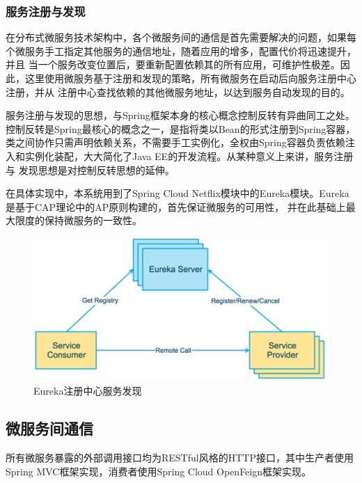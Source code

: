 \documentclass[titlepage,UTF8,linespread=1.5]{ctexart}
\begin{document}
\subsubsection{服务注册与发现}
在分布式微服务技术架构中，各个微服务间的通信是首先需要解决的问题，如果每个微服务手工指定其他服务的通信地址，随着应用的增多，配置代价将迅速提升，并且
当一个服务改变位置后，要重新配置依赖其的所有应用，可维护性极差。因此，这里使用微服务基于注册和发现的策略，所有微服务在启动后向服务注册中心注册，并从
注册中心查找依赖的其他微服务地址，以达到服务自动发现的目的\cite{service-discovery-in-a-microservices-architecture}。\par
服务注册与发现的思想，与Spring框架本身的核心概念控制反转有异曲同工之处。控制反转是Spring最核心的概念之一，是指将类以Bean的形式注册到Spring容器，
类之间协作只需声明依赖关系，不需要手工实例化，全权由Spring容器负责依赖注入和实例化装配，大大简化了Java EE的开发流程。从某种意义上来讲，服务注册与
发现思想是对控制反转思想的延伸。\par
在具体实现中，本系统用到了Spring Cloud Netflix模块中的Eureka模块。Eureka是基于CAP理论\cite{cap}中的AP原则构建的，首先保证微服务的可用性，
并在此基础上最大限度的保持微服务的一致性。\par
\begin{figure}[H]
    \centering
    \includegraphics[width=130mm]{struct-eureka.png}
    \caption{Eureka注册中心服务发现}
    \label{fig:struct-eureka}
\end{figure}

\subsection{微服务间通信}
所有微服务暴露的外部调用接口均为RESTful风格的HTTP接口，其中生产者使用Spring MVC框架实现，消费者使用Spring Cloud OpenFeign框架实现。\par
\end{document}
